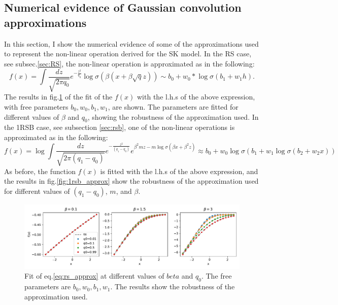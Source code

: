 \documentclass[10pt, notitlepage]{revtex4-2}
\begin{document}
\subsection{Numerical evidence of Gaussian convolution approximations}
\label{sec:num_evidence}
In this section, I show the numerical evidence of some of the approximations used to represent the non-linear operation derived for the SK model. In the RS case, see subsec.\ref{sec:RS}, the non-linear operation is approximated as in the following:
\begin{equation}
    \label{eq:rs_approx}
    f(x) = \int \frac{dz}{\sqrt{2 \pi q_0}} e^{-\frac{z^2}{q_0}}
\log \sigma \left(\beta \left(
x +\beta \sqrt{q}z \right)\right) \sim b_0 + w_0*\log \sigma(b_1 + w_1 h). 
\end{equation}
The results in fig.\ref{fig:rs_approx} of the fit of the $f(x)$ with the l.h.s of the above expression, with free parameters $b_0, w_0, b_1, w_1$, are shown. The parameters are fitted for different values of $\beta$ and $q_0$, showing the robustness of the approximation used.  In the 1RSB case, see subsection \ref{sec:rsb}, one of the non-linear operations is approximated as in the following:
\begin{equation}
    f(x) = \log \int  \frac{dz}{\sqrt{2 \pi (q_1-q_0)}} e^{-\frac{z^2}{(q_1-q_0)}} e^{ \beta^2 m z - m \log \sigma \left(\beta x+\beta^2 z \right) }  \approx b_0  + w_0  \log\sigma(b_1  + w_1  \log \sigma (b_2  + w_2  x))
    \label{eq:1rsb_approx}
\end{equation}
As before, the function $f(x)$ is fitted with the l.h.s of the above expression, and the results in fig.\ref{fig:1rsb_approx} show the robustness of the approximation used for different values of $(q_1-q_0)$, $m$, and $\beta$.
\begin{figure}[h]
    \centering
    \includegraphics[width=1\textwidth]{img/fit_rs.pdf}
    \caption{Fit of eq.\ref{eq:rs_approx} at different values of $beta$ and $q_0$. The free parameters are $b_0, w_0, b_1, w_1$. The results show the robustness of the approximation used. }
    \label{fig:rs_approx}
\end{figure}
\end{document}
